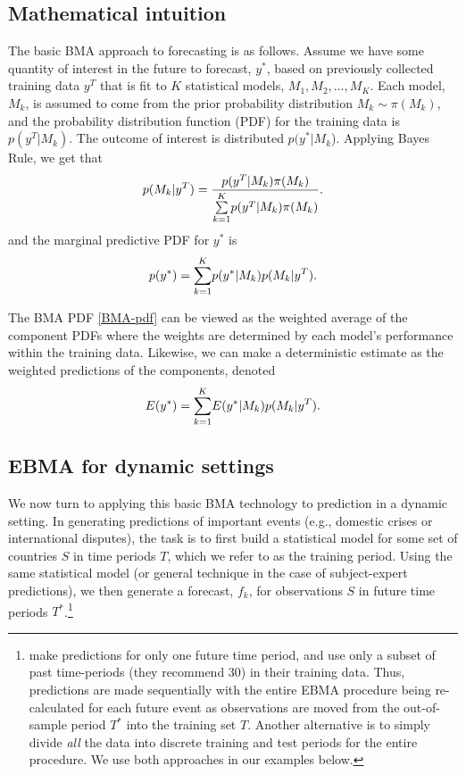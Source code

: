 \documentclass[pdftex,12pt,fullpage,oneside]{amsart}
\begin{document}
\subsection{Mathematical intuition}
The basic BMA approach to forecasting is as follows. Assume we have
some quantity of interest in the future to forecast, $y^*$, based on
previously collected training data $y^T$ that is fit to $K$
statistical models, $M_1, M_2, \ldots, M_K$. Each model, $M_k$, is
assumed to come from the prior probability distribution $M_k\sim
\pi(M_k)$, and the probability distribution function (PDF) for the
training data is $p(y^T|M_k)$. The outcome of interest is distributed
$p(y^*|M_k$).  Applying Bayes Rule, we get that
\begin{equation} \small
p(M_k|y^T) = \frac{p(y^T|M_k)\pi(M_k)}{\underset{k=1}{\overset{K}{\sum}}p(y^T|M_k)\pi(M_k)}.
\end{equation}
\noindent and the marginal predictive PDF for $y^*$ is
\begin{equation}
\label{BMA-pdf}
\small
p(y^*) = \underset{k=1}{\overset{K}{\sum}} p(y^*|M_k)p(M_k|y^T).
\end{equation}

The BMA PDF \eqref{BMA-pdf} can be viewed as the weighted average of
the component PDFs where the weights are determined by each model's
performance within the training data.  Likewise, we can make a
deterministic estimate as the weighted predictions of the components,
denoted
\begin{equation} \small
E(y^*) = \underset{k=1}{\overset{K}{\sum}} E(y^*|M_k)p(M_k|y^T).
\end{equation}

\subsection{EBMA for dynamic settings}

We now turn to applying this basic BMA technology to prediction in a
dynamic setting.  In generating predictions of important events (e.g.,
domestic crises or international disputes), the task is to first build
a statistical model for some set of countries $S$ in time periods $T$,
which we refer to as the training period.  Using the same statistical
model (or general technique in the case of subject-expert
predictions), we then generate a forecast, $f_k$, for observations $S$
in future time periods $T^*$.\footnote{\citet{Sloughter:2007} make
  predictions for only one future time period, and use only a subset
  of past time-periods (they recommend 30) in their training
  data. Thus, predictions are made sequentially with the entire EBMA
  procedure being re-calculated for each future event as observations
  are moved from the out-of-sample period $T^*$ into the training set
  $T$. Another alternative is to simply divide \textit{all} the data
  into discrete training and test periods for the entire procedure.
  We use both approaches in our examples below.} 
\end{document}
